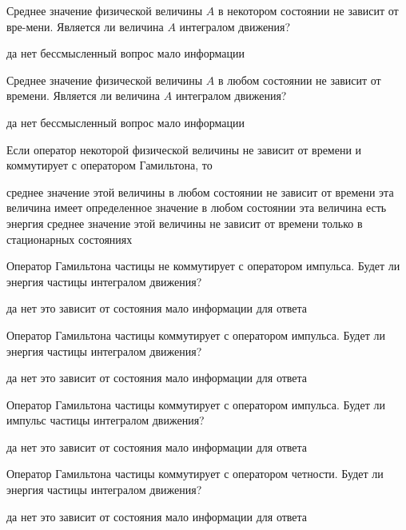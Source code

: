 \documentclass[11pt,a4paper]{exam}
\begin{document}
\begin{questions}
\question Среднее значение физической величины $A$ в некотором состоянии не зависит от вре-мени. Является ли величина $A$ интегралом движения?
\begin{choices}
\choice да     
\choice нет    
\choice бессмысленный вопрос     
\choice мало информации
\end{choices}

\question Среднее значение физической величины $A$ в любом состоянии не зависит от времени. Является ли величина $A$ интегралом движения?
\begin{choices}
\choice да     
\choice нет    
\choice бессмысленный вопрос     
\choice мало информации
\end{choices}

\question Если оператор некоторой физической величины не зависит от времени и коммутирует с оператором Гамильтона, то
\begin{choices}
\choice среднее значение этой величины в любом состоянии не зависит от времени
\choice эта величина имеет определенное значение в любом состоянии
\choice эта величина есть энергия
\choice среднее значение этой величины не зависит от времени только в стационарных состояниях
\end{choices}

\question Оператор Гамильтона частицы не коммутирует с оператором импульса. Будет ли энергия частицы интегралом движения?
\begin{choices}
\choice да     
\choice нет    
\choice это зависит от состояния    
\choice мало информации для ответа
\end{choices}

\question Оператор Гамильтона частицы коммутирует с оператором импульса. Будет ли энергия частицы интегралом движения?
\begin{choices}
\choice да     
\choice нет    
\choice это зависит от состояния    
\choice мало информации для ответа
\end{choices}

\question Оператор Гамильтона частицы коммутирует с оператором импульса. Будет ли импульс частицы интегралом движения?
\begin{choices}
\choice да     
\choice нет    
\choice это зависит от состояния    
\choice мало информации для ответа
\end{choices}

\question Оператор Гамильтона частицы коммутирует с оператором четности. Будет ли энергия частицы интегралом движения?
\begin{choices}
\choice да     
\choice нет    
\choice это зависит от состояния    
\choice мало информации для ответа
\end{choices}


\end{questions}
\end{document}
